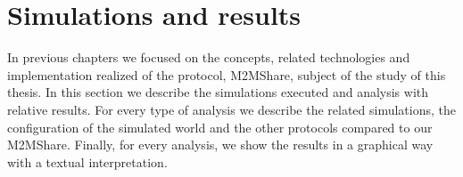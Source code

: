 
\chapter{Simulations and results}\label{simulazione} %





In previous chapters we focused on the concepts, related technologies and implementation realized of the protocol, M2MShare, subject of the study of this thesis. In this section we describe the simulations executed and analysis with relative results. For every type of analysis we describe the related simulations, the configuration of the simulated world and the other protocols compared to our M2MShare. Finally, for every analysis, we show the results in a graphical way with a textual interpretation.
\\


